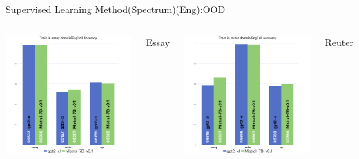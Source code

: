 \documentclass[serif]{beamer}
\begin{document}
\begin{frame}{Supervised Learning Method(Spectrum)(Eng):OOD}
\begin{columns}[t]
    \centering
    \includegraphics[width=\linewidth]{images/Train in essay domain(Eng) nll Accuracy.png}
    \caption*{Essay}

    \centering
    \includegraphics[width=\linewidth]{images/Train in reuter domain(Eng) nll Accuracy.png}
    \caption*{Reuter}


\end{columns}
\end{frame}
\end{document}
